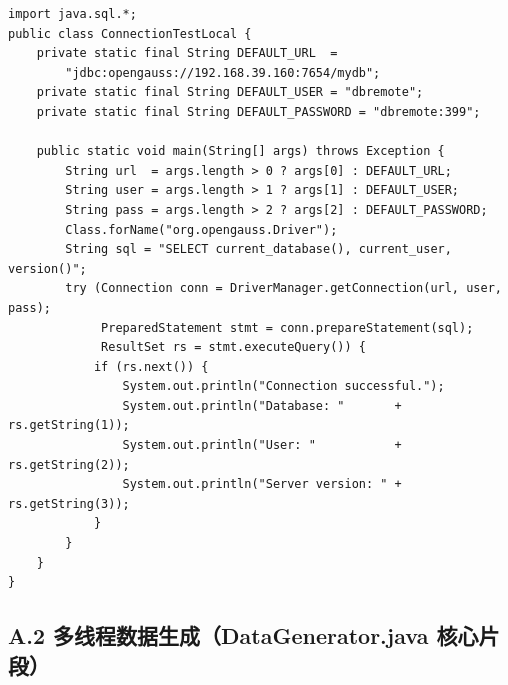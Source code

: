 \documentclass[12pt,a4paper]{ctexart}
\begin{document}
\begin{lstlisting}[style=javastyle]
import java.sql.*;
public class ConnectionTestLocal {
    private static final String DEFAULT_URL  =
        "jdbc:opengauss://192.168.39.160:7654/mydb";
    private static final String DEFAULT_USER = "dbremote";
    private static final String DEFAULT_PASSWORD = "dbremote:399";

    public static void main(String[] args) throws Exception {
        String url  = args.length > 0 ? args[0] : DEFAULT_URL;
        String user = args.length > 1 ? args[1] : DEFAULT_USER;
        String pass = args.length > 2 ? args[2] : DEFAULT_PASSWORD;
        Class.forName("org.opengauss.Driver");
        String sql = "SELECT current_database(), current_user, version()";
        try (Connection conn = DriverManager.getConnection(url, user, pass);
             PreparedStatement stmt = conn.prepareStatement(sql);
             ResultSet rs = stmt.executeQuery()) {
            if (rs.next()) {
                System.out.println("Connection successful.");
                System.out.println("Database: "       + rs.getString(1));
                System.out.println("User: "           + rs.getString(2));
                System.out.println("Server version: " + rs.getString(3));
            }
        }
    }
}
\end{lstlisting}

\subsection*{A.2 多线程数据生成（DataGenerator.java 核心片段）}
\end{document}
